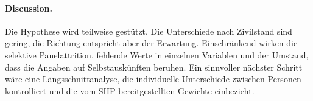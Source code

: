 \begin{extraAbstract}
\paragraph{Discussion.}
Die Hypothese wird teilweise gestützt. Die Unterschiede nach Zivilstand sind gering, die
Richtung entspricht aber der Erwartung. Einschränkend wirken die selektive
Panelattrition, fehlende Werte in einzelnen Variablen und der Umstand, dass die Angaben
auf Selbstauskünften beruhen. Ein sinnvoller nächster Schritt wäre eine
Längsschnittanalyse, die individuelle Unterschiede zwischen Personen kontrolliert und
die vom SHP bereitgestellten Gewichte einbezieht.

\end{extraAbstract}
